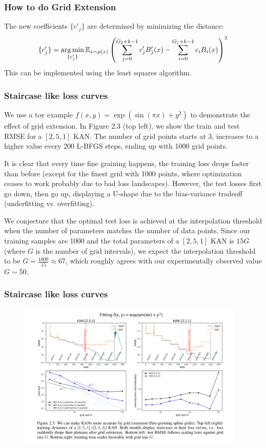 \documentclass[serif, aspectratio=169]{beamer}
\newcommand{\argmin}{\operatornamewithlimits{arg\,min}}
\begin{document}
\begin{frame}
    \frametitle<presentation>{How to do Grid Extension}
    The new coefficients \( \{c'_j\} \) are determined by minimizing the distance:
    \[
        \{c'_j\} = \argmin_{\{c'_j\}} \mathbb{E}_{x \sim p(x)} \left( \sum_{j=0}^{G_2+k-1} c'_j B'_j(x) - \sum_{i=0}^{G_1+k-1} c_i B_i(x) \right)^2
    \]
    This can be implemented using the least squares algorithm.
\end{frame}
\begin{frame}
    \frametitle<presentation>{Staircase like loss curves}
    We use a toy example \( f(x, y) = \exp(\sin(\pi x) + y^2) \) to demonstrate the effect of grid extension. In Figure 2.3 (top left), we show the train and test RMSE for a \([2, 5, 1]\) KAN. The number of grid points starts at 3, increases to a higher value every 200 L-BFGS steps, ending up with 1000 grid points.

    It is clear that every time fine graining happens, the training loss drops faster than before (except for the finest grid with 1000 points, where optimization ceases to work probably due to bad loss landscapes). However, the test losses first go down, then go up, displaying a U-shape due to the bias-variance tradeoff (underfitting vs. overfitting).

    We conjecture that the optimal test loss is achieved at the interpolation threshold when the number of parameters matches the number of data points. Since our training samples are 1000 and the total parameters of a \([2, 5, 1]\) KAN is \(15G\) (where \(G\) is the number of grid intervals), we expect the interpolation threshold to be \( G = \frac{1000}{15} \approx 67 \), which roughly agrees with our experimentally observed value \( G \sim 50 \).
\end{frame}
\begin{frame}
    \frametitle<presentation>{Staircase like loss curves}
    \begin{figure}
        \centering
        \includegraphics[height=7cm]{image copy 20.png}
    \end{figure}
\end{frame}
\end{document}
